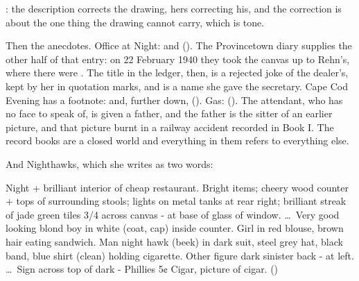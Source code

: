 \noindent {}: the description corrects the drawing, hers correcting his, and the correction is about the one thing the drawing cannot carry, which is tone.

Then the anecdotes. Office at Night:  and  (). The Provincetown diary supplies the other half of that entry: on 22 February 1940 they took the canvas up to Rehn's, where there were . The title in the ledger, then, is a rejected joke of the dealer's, kept by her in quotation marks, and  is a name she gave the secretary. Cape Cod Evening has a footnote:  and, further down,  (). Gas:  (). The attendant, who has no face to speak of, is given a father, and the father is the sitter of an earlier picture, and that picture burnt in a railway accident recorded in Book I. The record books are a closed world and everything in them refers to everything else.

And Nighthawks, which she writes as two words:

\begin{leafquote}
Night + brilliant interior of cheap restaurant. Bright items; cheery wood counter + tops of surrounding stools; lights on metal tanks at rear right; brilliant streak of jade green tiles 3/4 across canvas - at base of glass of window. \ldots\ Very good looking blond boy in white (coat, cap) inside counter. Girl in red blouse, brown hair eating sandwich. Man night hawk (beek) in dark suit, steel grey hat, black band, blue shirt (clean) holding cigarette. Other figure dark sinister back - at left. \ldots\ Sign across top of  dark - Phillies 5¢ Cigar, picture of cigar. \hfill ()
\end{leafquote}

